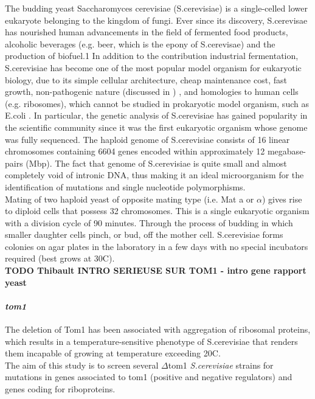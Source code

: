 \documentclass[10pt,a4paper]{article}
\begin{document}
The budding yeast Saccharomyces cerevisiae (S.cerevisiae) is a single-celled lower eukaryote belonging to the kingdom of fungi. Ever since its discovery, S.cerevisae has nourished human advancements in the field of fermented food products, alcoholic beverages (e.g. beer, which is the epony of S.cerevisae) and the production of biofuel.1 In addition to the contribution industrial fermentation, S.cerevisiae has become one of the most popular model organism for eukaryotic biology, due to its simple cellular architecture, cheap maintenance cost, fast growth, non-pathogenic nature (discussed in \cite{perez-torrado_opportunistic_2016}) , and homologies to human cells (e.g. ribosomes), which cannot be studied in prokaryotic model organism, such as E.coli \cite{botstein_yeast_2011}. In particular, the genetic analysis of S.cerevisiae has gained popularity in the scientific community since it was the first eukaryotic organism whose genome was fully sequenced. The haploid genome of S.cerevisiae consists of 16 linear chromosomes containing 6604 genes encoded within approximately 12 megabase-pairs (Mbp)\cite{belda_saccharomyces_2019}. The fact that genome of S.cerevisiae is quite small and almost completely void of intronic DNA, thus making it an ideal microorganism for the identification of mutations and single nucleotide polymorphisms.\\

Mating of two haploid yeast of opposite mating type (i.e. Mat a or $\alpha $) gives rise to diploid cells that possess 32 chromosomes. This is a single eukaryotic organism with a division cycle of 90 minutes. Through the process of budding in which smaller daughter cells pinch, or bud, off the mother cell. S.cerevisiae forms colonies on agar plates in the laboratory in a few days with no special incubators required (best grows at 30\degree C).\\


\textbf{TODO Thibault INTRO SERIEUSE SUR TOM1 - intro gene rapport yeast}

\paragraph{\textit{tom1}} The deletion of Tom1 has been associated with aggregation of ribosomal proteins, which results in a temperature-sensitive phenotype of S.cerevisiae that renders them incapable of growing at temperature exceeding 20\degree C. \\

The aim of this study is to screen several $ \Delta $tom1 \textit{S.cerevisiae} strains for mutations in genes associated to tom1 (positive and negative regulators) and genes coding for riboproteins. \\
\end{document}
